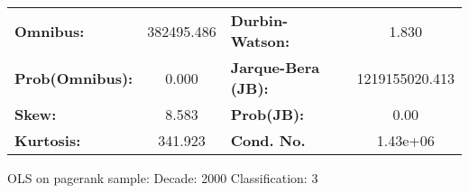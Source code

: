 \begin{center}
\begin{tabular}{lccccc}
\bottomrule
\end{tabular}
\begin{tabular}{lclc}
\textbf{Omnibus:}       & 382495.486 & \textbf{  Durbin-Watson:     } &       1.830     \\
\textbf{Prob(Omnibus):} &    0.000   & \textbf{  Jarque-Bera (JB):  } & 1219155020.413  \\
\textbf{Skew:}          &    8.583   & \textbf{  Prob(JB):          } &        0.00     \\
\textbf{Kurtosis:}      &  341.923   & \textbf{  Cond. No.          } &    1.43e+06     \\
\bottomrule
\end{tabular}
\end{center}
\break
OLS on pagerank sample: Decade: 2000 Classification: 3
